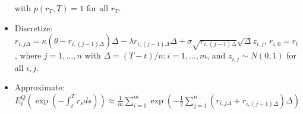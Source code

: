 \documentclass{article}
\begin{document}
\begin{itemize}
with $p(r_T, T) = 1$ for all $r_T$.

\item Discretize: $r_{i,j\Delta} = \kappa (\theta - r_{i,(j-1)\Delta})\Delta - \lambda r_{i,(j-1)\Delta} \Delta + \sigma \sqrt{r_{i,(j-1)\Delta}} \sqrt{\Delta} z_{i,j}$, $r_{i,0} = r_t$, where $j=1, ..., n$ with $\Delta = (T-t)/n; i = 1, ..., m$, and $z_{i,j} \sim N(0,1)$ for all $i,j$.

\item Approximate: $E_t^Q (\exp(-\int_t^T r_s ds)) \approx \frac{1}{m} \sum_{i=1}^m \exp(-\frac{1}{2} \sum_{j=1}^n (r_{i,j\Delta} + r_{i,(j-1)\Delta}) \Delta)$

\end{itemize}
\end{document}
